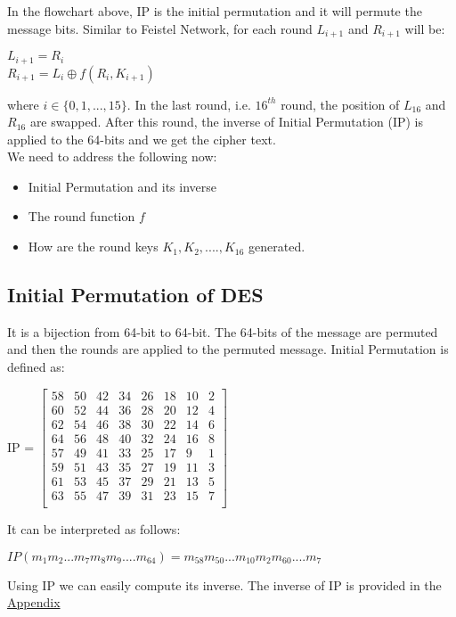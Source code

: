 \documentclass[11pt]{article}
\begin{document}
In the flowchart above, IP is the initial permutation and it will permute the message bits. Similar to Feistel Network, for each round $L_{i+1}$ and $R_{i+1}$ will be:
\begin{center}
    $L_{i+1} = R_i$\\
    $R_{i+1} = L_i \oplus f(R_i, K_{i+1})$
\end{center}
where $i \in \{0, 1,..., 15\}$. In the last round, i.e. $16^{th}$ round, the position of $L_{16}$ and $R_{16}$ are swapped. After this round, the inverse of Initial Permutation (IP) is applied to the 64-bits and we get the cipher text.\\
\newline
We need to address the following now:
\begin{itemize}
    \item Initial Permutation and its inverse
    \item The round function $f$
    \item How are the round keys $K_1, K_2, ...., K_{16}$ generated.
\end{itemize}

\subsection{Initial Permutation of DES}
It is a bijection from 64-bit to 64-bit. The 64-bits of the message are permuted and then the rounds are applied to the permuted message. Initial Permutation is defined as:
\begin{center}
IP =  
    $\begin{bmatrix}
    58 & 50 & 42 & 34 & 26 & 18 & 10 & 2\\
    60 & 52 & 44 & 36 & 28 & 20 & 12 & 4\\
    62 & 54 & 46 & 38 & 30 & 22 & 14 & 6\\
    64 & 56 & 48 & 40 & 32 & 24 & 16 & 8\\
    57 & 49 & 41 & 33 & 25 & 17 & 9 & 1\\
    59 & 51 & 43 & 35 & 27 & 19 & 11 & 3\\
    61 & 53 & 45 & 37 & 29 & 21 & 13 & 5\\
    63 & 55 & 47 & 39 & 31 & 23 & 15 & 7\\
    \end{bmatrix}$
\end{center}
It can be interpreted as follows:
\begin{center}
    $IP(m_1m_2...m_7m_8m_9....m_{64}) = m_{58}m_{50}...m_{10}m_2m_{60}....m_7 $
\end{center}
Using IP we can easily compute its inverse. The inverse of IP is provided in the \hyperref[appendix]{Appendix}
\end{document}
